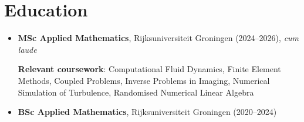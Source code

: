 \section*{Education}
\begin{itemize}
    \item \textbf{MSc Applied Mathematics}, Rijksuniversiteit Groningen
    (2024--2026), \textit{cum laude}

    \textbf{Relevant coursework}: Computational Fluid Dynamics, Finite Element
    Methods, Coupled Problems, Inverse Problems in Imaging, Numerical Simulation
    of Turbulence, Randomised Numerical Linear Algebra
    \item \textbf{BSc Applied Mathematics}, Rijksuniversiteit Groningen
    (2020--2024) 
 
\end{itemize}